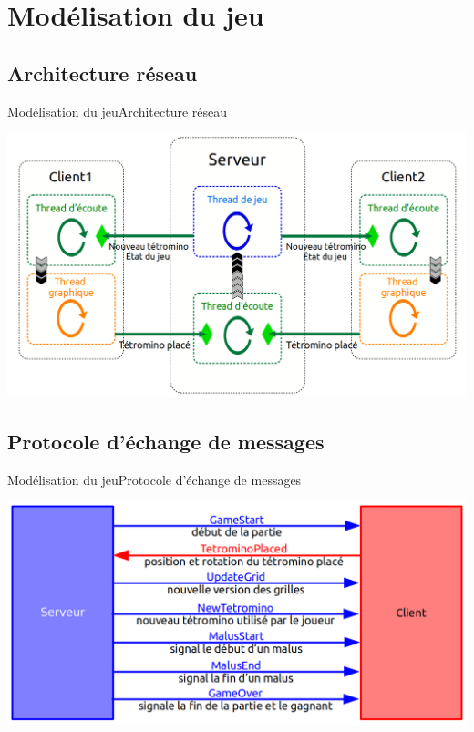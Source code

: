 \documentclass[french]{beamer}
\begin{document}
\section{Modélisation du jeu}
	\subsection{Architecture réseau}

		\begin{frame}{Modélisation du jeu}{Architecture réseau}
			\begin{center}
				\includegraphics[scale=0.25]{img/archi_reseau.png}
			\end{center}
		\end{frame}

	\subsection{Protocole d'échange de messages}

		\begin{frame}{Modélisation du jeu}{Protocole d'échange de messages}
			\begin{center}
				\includegraphics[scale=0.3]{img/ech.png}
			\end{center}
		\end{frame}
\end{document}
